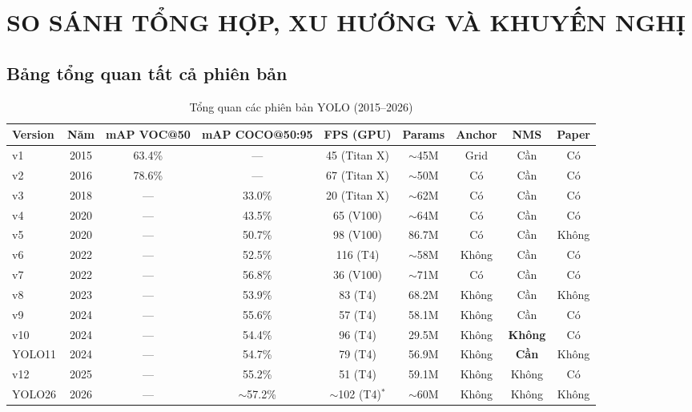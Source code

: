 \chapter{SO SÁNH TỔNG HỢP, XU HƯỚNG VÀ KHUYẾN NGHỊ}

\section{Bảng tổng quan tất cả phiên bản}

\begin{table}[H]\centering
\caption{Tổng quan các phiên bản YOLO (2015--2026)}
\scriptsize
\begin{tabular}{lcccccccc}\toprule
\textbf{Version} & \textbf{Năm} & \textbf{mAP VOC@50} & \textbf{mAP COCO@50:95} & \textbf{FPS (GPU)} & \textbf{Params} & \textbf{Anchor} & \textbf{NMS} & \textbf{Paper}\\\midrule
v1 \cite{yolov1} & 2015 & 63.4\% & --- & 45 (Titan X) & $\sim$45M & Grid & Cần & Có \\
v2 \cite{yolov2} & 2016 & 78.6\% & --- & 67 (Titan X) & $\sim$50M & Có & Cần & Có \\
v3 \cite{yolov3} & 2018 & --- & 33.0\% & 20 (Titan X) & $\sim$62M & Có & Cần & Có \\
v4 \cite{yolov4} & 2020 & --- & 43.5\% & 65 (V100) & $\sim$64M & Có & Cần & Có \\
v5 \cite{yolov5} & 2020 & --- & 50.7\% & 98 (V100) & 86.7M & Có & Cần & Không \\
v6 \cite{yolov6} & 2022 & --- & 52.5\% & 116 (T4) & $\sim$58M & Không & Cần & Có \\
v7 \cite{yolov7} & 2022 & --- & 56.8\% & 36 (V100) & $\sim$71M & Có & Cần & Có \\
v8 \cite{yolov8} & 2023 & --- & 53.9\% & 83 (T4) & 68.2M & Không & Cần & Không \\
v9 \cite{yolov9} & 2024 & --- & 55.6\% & 57 (T4) & 58.1M & Không & Cần & Có \\
v10 \cite{yolov10} & 2024 & --- & 54.4\% & 96 (T4) & 29.5M & Không & \textbf{Không} & Có \\
YOLO11 \cite{yolo11} & 2024 & --- & 54.7\% & 79 (T4) & 56.9M & Không & \textbf{Cần} & Không \\
v12 \cite{yolov12} & 2025 & --- & 55.2\% & 51 (T4) & 59.1M & Không & Không & Có \\
YOLO26 \cite{yolo26} & 2026 & --- & $\sim$57.2\% & $\sim$102 (T4)$^*$ & $\sim$60M & Không & Không & Không \\
\bottomrule
\end{tabular}
\end{table}

